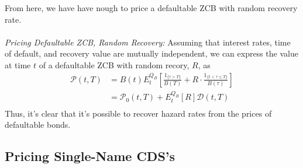 \documentclass[a4paper,12pt]{scrartcl}
\begin{document}
From here, we have have nough to price a defaultable ZCB with random
recovery rate.
\\
\\
{\sl Pricing Defaultable ZCB, Random Recovery:} Assuming that interest
rates, time of default, and recovery value are mutually independent, 
we can express the value at time $t$ of a defaultable ZCB with random
recory, $R$, as 
\begin{align*}
   \mathcal{P}(t,T)&=B(t) E_t^{Q_B} \left[ \frac{1_{ \{\tau>T\}}}{B(T)}
      + R \cdot \frac{ 1_{ \{ t < \tau \leq T\}}}{B(\tau)}\right] \\
   &= \mathcal{P}_0(t,T) + E_t^{Q_B} [R] \mathcal{D}(t,T) \\
\end{align*}
Thus, it's clear that it's possible to recover hazard rates from the
prices of defaultable bonds.

\newpage
\subsection{Pricing Single-Name CDS's}
\end{document}
